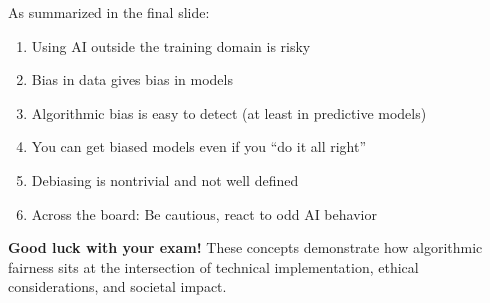 As summarized in the final slide:

\begin{enumerate}
    \item Using AI outside the training domain is risky
    \item Bias in data gives bias in models
    \item Algorithmic bias is easy to detect (at least in predictive models)
    \item You can get biased models even if you ``do it all right''
    \item Debiasing is nontrivial and not well defined
    \item Across the board: Be cautious, react to odd AI behavior
\end{enumerate}

\textbf{Good luck with your exam!} These concepts demonstrate how algorithmic fairness sits at the intersection of technical implementation, ethical considerations, and societal impact.
